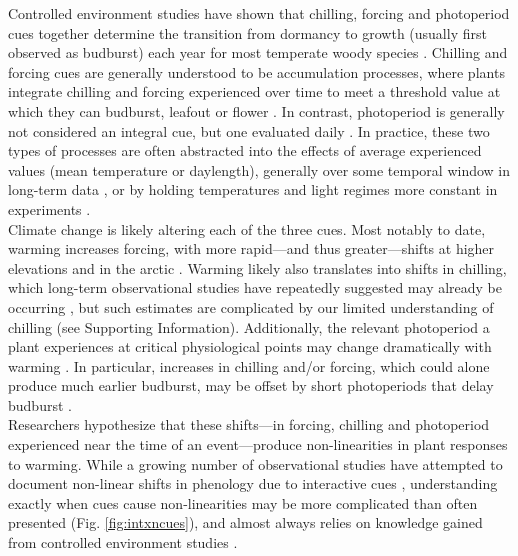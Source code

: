 \documentclass[11pt,letter]{article}
\begin{document}
Controlled environment studies have shown that chilling, forcing and photoperiod cues together determine the transition from dormancy to growth (usually first observed as budburst) each year for most temperate woody species \citep{vanderschoot2014,chuinearees,Singh:2017,ettinger2020,chang2021}. Chilling and forcing cues are generally understood to be accumulation processes, where plants integrate chilling and forcing experienced over time to meet a threshold value at which they can budburst, leafout or flower \citep{Chuine2000}. In contrast, photoperiod is generally not considered an integral cue, but one evaluated daily \citep{Singh:2017}. In practice, these two types of processes are often abstracted into the effects of average experienced values (mean temperature or daylength), generally over some temporal window in long-term data \citep[e.g.,][]{Wolkovich:2012n,fu2015}, or by holding temperatures and light regimes more constant in experiments \citep[e.g.,][]{Worrall:1967aa,Heide:1993,Heide:1993a,Skuterud:1994aa}. \\ %

Climate change is likely altering each of the three cues. Most notably to date, warming increases forcing, with more rapid---and thus greater---shifts at higher elevations and in the arctic \citep{IPCC:2014sm}. Warming likely also translates into shifts in chilling, which long-term observational studies have repeatedly suggested may already be occurring \citep{fu2015,piao2017}, but such estimates are complicated by our limited understanding of chilling (see Supporting Information). Additionally, the relevant photoperiod a plant experiences at critical physiological points may change dramatically with warming \citep[despite that an environment's photoperiod does not shift with climate change,][]{ospreephoto}. In particular, increases in chilling and/or forcing, which could alone produce much earlier budburst, may be offset by short photoperiods that delay budburst \citep{gauzere2019}. \\ %

Researchers hypothesize that these shifts---in forcing, chilling and photoperiod experienced near the time of an event---produce non-linearities in plant responses to warming. While a growing number of observational studies have attempted to document non-linear shifts in phenology due to interactive cues \citep{fu2015,gauzere2019}, understanding exactly when cues cause non-linearities may be more complicated than often presented (Fig. \ref{fig:intxncues}), and almost always relies on knowledge gained from controlled environment studies \citep[e.g.,][]{fu2015,richardson2018,gauzere2019}.
\end{document}
